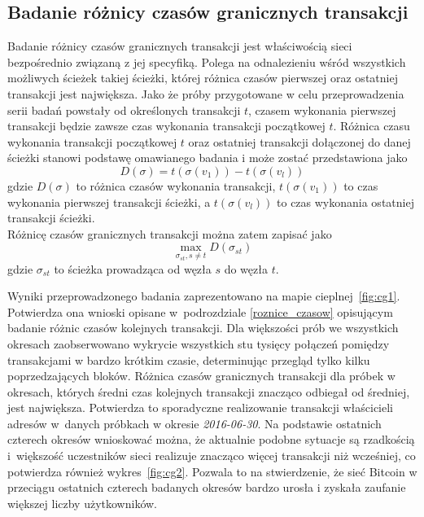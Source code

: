 \documentclass[12pt, oneside, final, openany]{mgr}
\begin{document}
\if@archive\else{\newpage}\fi
\subsection{Badanie różnicy czasów granicznych transakcji}
\label{graniczne_transakcje}
\indent Badanie różnicy czasów granicznych transakcji jest właściwością sieci bezpośrednio związaną z jej specyfiką. Polega na odnalezieniu wśród wszystkich możliwych ścieżek takiej ścieżki, której różnica czasów pierwszej oraz ostatniej transakcji jest największa. Jako że próby przygotowane w celu przeprowadzenia serii badań powstały od określonych transakcji $t$, czasem wykonania pierwszej transakcji będzie zawsze czas wykonania transakcji początkowej $t$. Różnica czasu wykonania transakcji początkowej $t$ oraz ostatniej transakcji dołączonej do danej ścieżki stanowi podstawę omawianego badania i może zostać przedstawiona jako
\begin{equation}
D(\sigma) = t(\sigma(v_1)) - t(\sigma(v_l))
\end{equation}
gdzie $D(\sigma)$ to różnica czasów wykonania transakcji, $t(\sigma(v_1))$ to czas wykonania pierwszej transakcji ścieżki, a $t(\sigma(v_l))$ to czas wykonania ostatniej transakcji ścieżki.
\\ Różnicę czasów granicznych transakcji można zatem zapisać jako
\begin{equation}
 \max_{\sigma_{st},s \ne t} D(\sigma_{st})
\end{equation}
gdzie $\sigma_{st}$ to ścieżka prowadząca od węzła $s$ do węzła $t$.

\indent Wyniki przeprowadzonego badania zaprezentowano na mapie cieplnej~\ref{fig:cg1}. Potwierdza ona wnioski opisane w~podrozdziale \ref{roznice_czasow} opisującym badanie różnic czasów kolejnych transakcji. Dla większości prób we wszystkich okresach zaobserwowano wykrycie wszystkich stu tysięcy połączeń pomiędzy transakcjami w bardzo krótkim czasie, determinując przegląd tylko kilku poprzedzających bloków. Różnica czasów granicznych transakcji dla próbek w okresach, których średni czas kolejnych transakcji znacząco odbiegał od średniej, jest największa. Potwierdza to sporadyczne realizowanie transakcji właścicieli adresów w~danych próbkach w okresie \textit{2016-06-30}. Na podstawie ostatnich czterech okresów wnioskować można, że aktualnie podobne sytuacje są rzadkością i~większość uczestników sieci realizuje znacząco więcej transakcji niż wcześniej, co potwierdza również wykres~\ref{fig:cg2}. Pozwala to na stwierdzenie, że sieć Bitcoin w przeciągu ostatnich czterech badanych okresów bardzo urosła i zyskała zaufanie większej liczby użytkowników.
\end{document}
